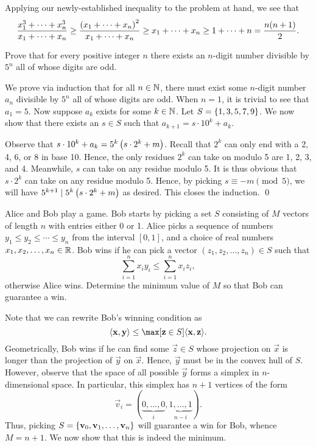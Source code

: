 Applying our newly-established inequality to the problem at hand, we see that \[\frac{x_1^3 + \cdots + x_n^3}{x_1 + \cdots + x_n} \geq \frac{\left( x_1 + \cdots + x_n \right)^2}{x_1 + \cdots + x_n} \geq x_1 + \cdots + x_n \geq 1 + \cdots + n = \frac{n(n+1)}2.\]

\begin{question}\label{A::2024-O-2-3}
    Prove that for every positive integer $n$ there exists an $n$-digit number divisible by $5^n$ all of whose digits are odd.
\end{question}


We prove via induction that for all $n \in \mathbb{N}$, there must exist some $n$-digit number $a_n$  divisible by $5^n$ all of whose digits are odd. When $n = 1$, it is trivial to see that $a_1 = 5$. Now suppose $a_k$ exists for some $k \in \mathbb{N}$. Let $S = \left\lbrace 1, 3, 5, 7, 9 \right\rbrace$. We now show that there exists an $s \in S$ such that $a_{k+1} = s \cdot 10^k + a_k$.

Observe that $s \cdot 10^k + a_k = 5^k \left( s \cdot 2^k + m \right)$. Recall that $2^k$ can only end with a 2, 4, 6, or 8 in base 10. Hence, the only residues $2^k$ can take on modulo 5 are 1, 2, 3, and 4. Meanwhile, $s$ can take on any residue modulo 5. It is thus obvious that $s \cdot 2^k$ can take on any residue modulo 5. Hence, by picking $s \equiv -m \pmod{5}$, we will have $5^{k+1} \mid 5^k \left( s \cdot 2^k + m \right)$ as desired. This closes the induction. \qed

\begin{question}[$n+1$]\label{A::2024-O-2-4}
    Alice and Bob play a game. Bob starts by picking a set $S$ consisting of $M$ vectors of length $n$ with entries either 0 or 1. Alice picks a sequence of numbers $y_1 \leq y_2 \leq \cdots \leq y_n$ from the interval $[0, 1]$, and a choice of real numbers $x_1, x_2, \ldots, x_n \in \mathbb{R}$. Bob wins if he can pick a vector $(z_1, z_2, \ldots, z_n) \in S$ such that \[\sum_{i=1}^n x_i y_i \leq \sum_{i=1}^n x_i z_i,\] otherwise Alice wins. Determine the minimum value of $M$ so that Bob can guarantee a win.
\end{question}


 Note that we can rewrite Bob's winning condition as \[\ba{\vec x, \vec y} \leq \max[\vec z \in S] \ba{\vec x, \vec z}.\] Geometrically, Bob wins if he can find some $\vec z \in S$ whose projection on $\vec x$ is longer than the projection of $\vec y$ on $\vec x$. Hence, $\vec y$ must be in the convex hull of $S$. However, observe that the space of all possible $\vec y$ forms a simplex in $n$-dimensional space. In particular, this simplex has $n+1$ vertices of the form \[\vec v_i = (\underbrace{0, \ldots, 0}_{i}, \underbrace{1, \ldots, 1}_{n-i}).\] Thus, picking $S = \left\lbrace \mathbf{v}_0, \mathbf{v}_1, \ldots, \mathbf{v}_n \right\rbrace$ will guarantee a win for Bob, whence $M = n+1$. We now show that this is indeed the minimum.

